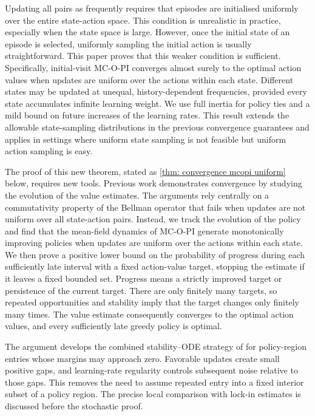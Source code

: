 Updating all pairs as frequently requires that episodes are initialised uniformly over the entire state-action space.
This condition is unrealistic in practice, especially when the state space is large.
However, once the initial state of an episode is selected, uniformly sampling the initial action is usually straightforward.
This paper proves that this weaker condition is sufficient.
Specifically, initial-visit MC-O-PI converges almost surely to the optimal action values when updates are uniform over the actions within each state.
Different states may be updated at unequal, history-dependent frequencies, provided every state accumulates infinite learning weight. We use full inertia for policy ties and a mild bound on future increases of the learning rates.
This result extends the allowable state-sampling distributions in the previous convergence guarantees
and applies in settings where uniform state sampling is not feasible but uniform action sampling is easy.






















The proof of this new theorem, stated as \autoref{thm: convergence mcopi uniform} below, requires new tools. 
Previous work demonstrates convergence by studying the evolution of the value estimates. The arguments rely centrally on a commutativity property of the Bellman operator that fails when updates are not uniform over all state-action pairs.
Instead, we track the evolution of the policy and find that the mean-field dynamics of MC-O-PI generate monotonically improving policies when updates are uniform over the actions within each state.
We then prove a positive lower bound on the probability of progress during each sufficiently late interval with a fixed action-value target, stopping the estimate if it leaves a fixed bounded set. Progress means a strictly improved target or persistence of the current target. There are only finitely many targets, so repeated opportunities and stability imply that the target changes only finitely many times. The value estimate consequently converges to the optimal action values, and every sufficiently late greedy policy is optimal.

The argument develops the combined stability--ODE strategy of \citet[Section~5.4]{Kushner2003StochasticApplications} for policy-region entries whose margins may approach zero. Favorable updates create small positive gaps, and learning-rate regularity controls subsequent noise relative to those gaps. This removes the need to assume repeated entry into a fixed interior subset of a policy region. The precise local comparison with lock-in estimates is discussed before the stochastic proof.

